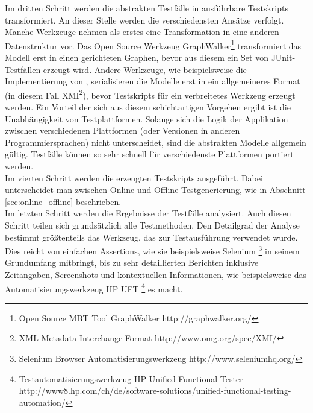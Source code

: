 Im dritten Schritt werden die abstrakten Testfälle in ausführbare Testskripts transformiert. An dieser Stelle werden die verschiedensten Ansätze verfolgt. Manche Werkzeuge nehmen als erstes eine Transformation in eine anderen Datenstruktur vor. Das Open Source Werkzeug GraphWalker\footnote{Open Source \Gls{MBT} Tool GraphWalker http://graphwalker.org/} transformiert das Modell erst in einen gerichteten Graphen, bevor aus diesem ein Set von JUnit-Testfällen erzeugt wird. Andere Werkzeuge, wie beispielsweise die Implementierung von \citeauthor{pinheiro_model-based_2013} \cite{pinheiro_model-based_2013}, serialisieren die Modelle erst in ein allgemeineres Format (in diesem Fall XMI\footnote{XML Metadata Interchange Format http://www.omg.org/spec/XMI/}), bevor Testskripts für ein verbreitetes Werkzeug erzeugt werden. Ein Vorteil der sich aus diesem schichtartigen Vorgehen ergibt ist die Unabhängigkeit von Testplattformen. Solange sich die Logik der Applikation zwischen verschiedenen Plattformen (oder Versionen in anderen Programmiersprachen) nicht unterscheidet, sind die abstrakten Modelle allgemein gültig. Testfälle können so sehr schnell für verschiedenste Plattformen portiert werden.\\
Im vierten Schritt werden die erzeugten Testskripts ausgeführt. Dabei unterscheidet man zwischen Online und Offline Testgenerierung, wie in Abschnitt \ref{sec:online_offline} beschrieben.\\
Im letzten Schritt werden die Ergebnisse der Testfälle analysiert. Auch diesen Schritt teilen sich grundsätzlich alle Testmethoden. Den Detailgrad der Analyse bestimmt größtenteils das Werkzeug, das zur Testausführung verwendet wurde. Dies reicht von einfachen Assertions, wie sie beispielsweise Selenium \footnote{Selenium Browser Automatisierungswerkzeug http://www.seleniumhq.org/} in seinem Grundumfang mitbringt, bis zu sehr detaillierten Berichten inklusive Zeitangaben, Screenshots und kontextuellen Informationen, wie beispielsweise das Automatisierungswerkzeug HP UFT \footnote{Testautomatisierungswerkzeug HP Unified Functional Tester http://www8.hp.com/ch/de/software-solutions/unified-functional-testing-automation/} es macht.

